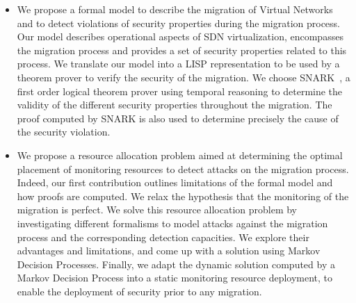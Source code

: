 \begin{itemize}
    \item We propose a formal model to describe the migration of Virtual Networks and to detect violations of security properties during the migration process.
    Our model describes operational aspects of SDN virtualization, encompasses the migration process and provides a set of security properties related to this process. We translate our model into a LISP representation to be used by a theorem prover to verify the security of the migration. We choose SNARK~\cite{snark-Stickel2000}, a first order logical theorem prover using temporal reasoning to determine the validity of the different security properties throughout the migration. The proof computed by SNARK is also used to determine precisely the cause of the security violation.
    
    \item  We propose a resource allocation problem aimed at determining the optimal placement of monitoring resources to detect attacks on the migration process. Indeed, our first contribution outlines limitations of the formal model and how proofs are computed. We relax the hypothesis that the monitoring of the migration is perfect. We solve this resource allocation problem by investigating different formalisms to model attacks against the migration process and the corresponding detection capacities. We explore their advantages and limitations, and come up with a solution using Markov Decision Processes. Finally, we adapt the dynamic solution computed by a Markov Decision Process into a static monitoring resource deployment, to enable the deployment of security prior to any migration.
\end{itemize}


